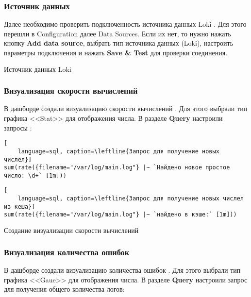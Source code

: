 \subsubsection{Источник данных}

Далее необходимо проверить подключенность источника данных Loki
.
Для этого перешли в Configuration далее Data Sources.
Если их нет, то нужно нажать кнопку \textbf{Add data source},
выбрать тип источника данных (Loki), настроить параметры подключения
и нажать \textbf{Save \& Test} для проверки соединения.

\begin{image}
    \caption{Источник данных Loki}
    \label{fig:datasource}
\end{image}

\subsubsection{Визуализация скорости вычислений}

В дашборде создали визуализацию  скорости вычислений .
Для этого выбрали тип графика <<Stat>> для отображения числа.
В разделе \textbf{Query} настроили запросы :

\begin{lstlisting}[
	language=sql, caption=\leftline{Запрос для получение новых числел}]
sum(rate({filename="/var/log/main.log"} |~ `Найдено новое простое число: \d+` [1m]))
\end{lstlisting}

\begin{lstlisting}[
	language=sql, caption=\leftline{Запрос для получение новых числел из кеша}]
sum(rate({filename="/var/log/main.log"} |~ `найдено в кэше:` [1m]))
\end{lstlisting}

\clearpage
\begin{image}
    \caption{Создание визуализации скорости вычислений}
    \label{fig:vis:total}
\end{image}

\subsubsection{Визуализация количества ошибок}

В дашборде создали визуализацию количества ошибок .
Для этого выбрали тип графика <<Gaue>> для отображения числа.
В разделе \textbf{Query} настроили запрос
для получения общего количества логов:

